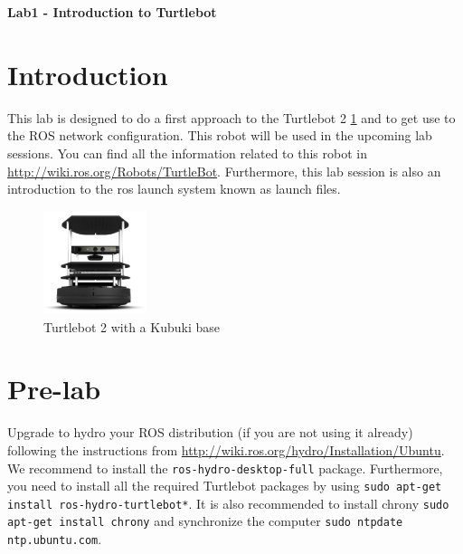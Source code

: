 \documentclass[a4paper,10pt]{article}
\begin{document}
\marginsize{2cm}{2cm}{2cm}{2cm}

\begin{center}
\Large \textbf{Lab1 - Introduction to Turtlebot}
\end{center}

\section{Introduction}

This lab is designed to do a first approach to the Turtlebot 2 \ref{fig:turtlebot2} and to get use to the ROS network configuration. This robot will be used in the upcoming lab sessions. You can find all the information related to this robot in \url{http://wiki.ros.org/Robots/TurtleBot}. Furthermore, this lab session is also an introduction to the ros launch system known as launch files.

\begin{figure}[h!]
	\centering
	\includegraphics[width=3cm]{turtlebot2}
	\caption{Turtlebot 2 with a Kubuki base}
	\label{fig:turtlebot2}
\end{figure}


\section{Pre-lab}

Upgrade to hydro your ROS distribution (if you are not using it already) following the instructions from \url{http://wiki.ros.org/hydro/Installation/Ubuntu}. We recommend to install the \texttt{ros-hydro-desktop-full} package. Furthermore, you need to install all the required Turtlebot packages by using \texttt{sudo apt-get install ros-hydro-turtlebot*}. It is also recommended to install chrony \texttt{sudo apt-get install chrony} and synchronize the computer \texttt{sudo ntpdate ntp.ubuntu.com}.
\end{document}
